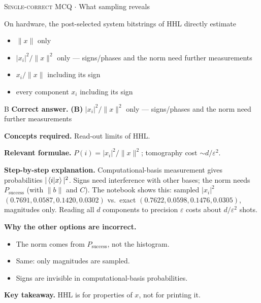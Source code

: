 \documentclass[11pt,a4paper]{article}
\newcommand{\optlabel}[1]{\textbf{(#1)}}
\newcommand{\correctlabel}[1]{\textcolor{okgreen}{\textbf{(#1)}\,\ding{51}}}
\newenvironment{qitem}[1]{\begin{list}{}{\setlength{\leftmargin}{3.3em}\setlength{\labelwidth}{3.1em}%
  \setlength{\labelsep}{0.2em}\setlength{\topsep}{3pt}\setlength{\parsep}{3pt}}\item[\textbf{Q.#1}\hfill]}{\end{list}}
\newcommand{\qsep}{\par\vspace{2pt}{\color{black!15}\hrule}\vspace{4pt}}
\newcommand{\qmeta}[2]{{\footnotesize\color{black!60}\textsc{#1} \;$\cdot$\; #2}\par}
\begin{document}
\begin{qitem}{56}
\qmeta{Single-correct MCQ}{What sampling reveals}
On hardware, the post-selected system bitstrings of HHL directly estimate
\begin{itemize}[leftmargin=2.6em, labelsep=0.4em, itemsep=2pt, topsep=3pt]
\item[\optlabel{A}] $\|x\|$ only
\item[\correctlabel{B}] $|x_i|^2/\|x\|^2$ only --- signs/phases and the norm need further measurements
\item[\optlabel{C}] $x_i/\|x\|$ including its sign
\item[\optlabel{D}] every component $x_i$ including its sign
\end{itemize}
\end{qitem}
\begin{solbox}{B}
\textbf{\color{brand}Correct answer.} \textcolor{okgreen}{\textbf{(B)}} $|x_i|^2/\|x\|^2$ only --- signs/phases and the norm need further measurements

\textbf{\color{brand}Concepts required.} Read-out limits of HHL.

\textbf{\color{brand}Relevant formulae.} $P(i) = |x_i|^2/\|x\|^2$; tomography cost $\sim d/\varepsilon^2$.

\textbf{\color{brand}Step-by-step explanation.} Computational-basis measurement gives probabilities $|\braket{i|x}|^2$. Signs need interference with other bases; the norm needs $P_{\text{success}}$ (with $\|b\|$ and $C$). The notebook shows this:
sampled $|x_i|^2$ $(0.7691, 0.0587, 0.1420, 0.0302)$ vs.\ exact $(0.7622, 0.0598, 0.1476, 0.0305)$, magnitudes only. Reading all $d$ components to precision $\varepsilon$
costs about $d/\varepsilon^2$ shots.

\textbf{\color{brand}Why the other options are incorrect.}
\begin{itemize}[leftmargin=2.4em, itemsep=1pt, topsep=2pt]
\item[\textbf{(A)}] The norm comes from $P_{\text{success}}$, not the histogram.
\item[\textbf{(C)}] Same: only magnitudes are sampled.
\item[\textbf{(D)}] Signs are invisible in computational-basis probabilities.
\end{itemize}
\textbf{\color{brand}Key takeaway.} HHL is for properties of $x$, not for printing it.
\end{solbox}
\qsep
\end{document}
